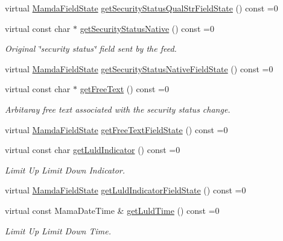\begin{CompactItemize}
virtual \hyperlink{namespaceWombat_93aac974f2ab713554fd12a1fa3b7d2a}{Mamda\-Field\-State} \hyperlink{classWombat_1_1MamdaSecStatusRecap_65f3b09b216df6fbe543f00934b8f93e}{get\-Security\-Status\-Qual\-Str\-Field\-State} () const =0
\item 
virtual const char $\ast$ \hyperlink{classWombat_1_1MamdaSecStatusRecap_328499a1789c66b0d775f207480ef314}{get\-Security\-Status\-Native} () const =0
\begin{CompactList}\small\item\em Original \char`\"{}security status\char`\"{} field sent by the feed. \item\end{CompactList}\item 
virtual \hyperlink{namespaceWombat_93aac974f2ab713554fd12a1fa3b7d2a}{Mamda\-Field\-State} \hyperlink{classWombat_1_1MamdaSecStatusRecap_18ac6dd6bffc701f7a2055d97d001fae}{get\-Security\-Status\-Native\-Field\-State} () const =0
\item 
virtual const char $\ast$ \hyperlink{classWombat_1_1MamdaSecStatusRecap_0c7ed2aa4c43501c34fd671bf4a860e6}{get\-Free\-Text} () const =0
\begin{CompactList}\small\item\em Arbitaray free text associated with the security status change. \item\end{CompactList}\item 
virtual \hyperlink{namespaceWombat_93aac974f2ab713554fd12a1fa3b7d2a}{Mamda\-Field\-State} \hyperlink{classWombat_1_1MamdaSecStatusRecap_37f29172463022e70f11ffa20ce80a0e}{get\-Free\-Text\-Field\-State} () const =0
\item 
virtual const char \hyperlink{classWombat_1_1MamdaSecStatusRecap_acecbbeb305d9e37961598e3c7bce2b3}{get\-Luld\-Indicator} () const =0
\begin{CompactList}\small\item\em Limit Up Limit Down Indicator. \item\end{CompactList}\item 
virtual \hyperlink{namespaceWombat_93aac974f2ab713554fd12a1fa3b7d2a}{Mamda\-Field\-State} \hyperlink{classWombat_1_1MamdaSecStatusRecap_cd0efb75dca37116bc753835ac720b01}{get\-Luld\-Indicator\-Field\-State} () const =0
\item 
virtual const Mama\-Date\-Time \& \hyperlink{classWombat_1_1MamdaSecStatusRecap_b53e48f73896500f5f752c6ee5d51a0c}{get\-Luld\-Time} () const =0
\begin{CompactList}\small\item\em Limit Up Limit Down Time. \item\end{CompactList}\item 

\end{CompactItemize}
